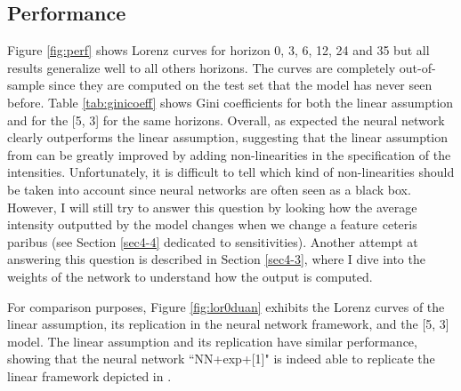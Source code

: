 \subsection{Performance}
\label{sec4-2}

Figure \ref{fig:perf} shows Lorenz curves for horizon 0, 3, 6, 12, 24 and 35 but all results generalize well to all others horizons. The curves are completely out-of-sample since they are computed on the test set that the model has never seen before. Table \ref{tab:ginicoeff} shows Gini coefficients for both the linear assumption \citet{Duan2012} and for the [5, 3] for the same horizons. Overall, as expected the neural network clearly outperforms the linear assumption, suggesting that the linear assumption from \citet{Duan2012} can be greatly improved by adding non-linearities in the specification of the intensities. Unfortunately, it is difficult to tell which kind of non-linearities should be taken into account since neural networks are often seen as a black box. However, I will still try to answer this question by looking how the average intensity outputted by the model changes when we change a feature ceteris paribus (see Section \ref{sec4-4} dedicated to sensitivities). Another attempt at answering this question is described in Section \ref{sec4-3}, where I dive into the weights of the network to understand how the output is computed.

For comparison purposes, Figure \ref{fig:lor0duan} exhibits the Lorenz curves of the linear assumption, its replication in the neural network framework, and the [5, 3] model. The linear assumption and its replication have similar performance, showing that the neural network ``NN+exp+[1]" is indeed able to replicate the linear framework depicted in \citet{Duan2012}.

